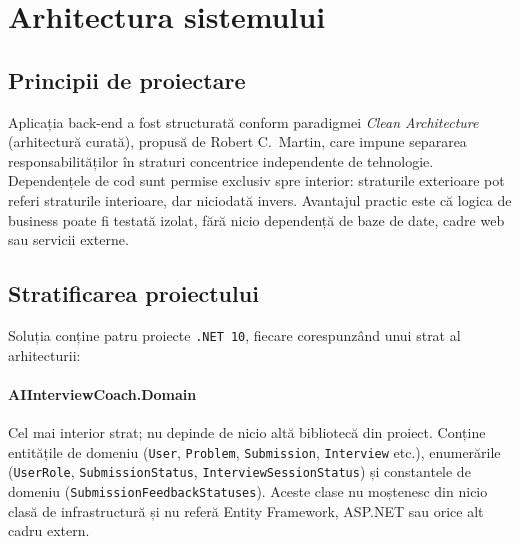 
\section{Arhitectura sistemului}
\label{sec:arhitectura}

\subsection{Principii de proiectare}

Aplicația back-end a fost structurată conform paradigmei \emph{Clean Architecture}
(arhitectură curată), propusă de Robert C.\ Martin, care impune separarea
responsabilităților în straturi concentrice independente de tehnologie.
Dependențele de cod sunt permise exclusiv spre interior: straturile exterioare
pot referi straturile interioare, dar niciodată invers.
Avantajul practic este că logica de business poate fi testată izolat, fără
nicio dependență de baze de date, cadre web sau servicii externe.

\subsection{Stratificarea proiectului}

Soluția conține patru proiecte \texttt{.NET~10}, fiecare corespunzând unui
strat al arhitecturii:

\paragraph{AIInterviewCoach.Domain}
Cel mai interior strat; nu depinde de nicio altă bibliotecă din proiect.
Conține entitățile de domeniu (\texttt{User}, \texttt{Problem}, \texttt{Submission},
\texttt{Interview} etc.), enumerările (\texttt{UserRole}, \texttt{SubmissionStatus},
\texttt{InterviewSessionStatus}) și constantele de domeniu
(\texttt{SubmissionFeedbackStatuses}).
Aceste clase nu moștenesc din nicio clasă de infrastructură și nu referă
Entity Framework, ASP.NET sau orice alt cadru extern.

